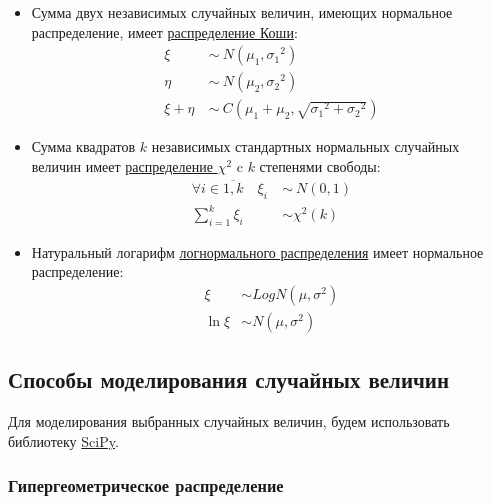 \documentclass[
  russian,
  a4paper,
]{article}
\begin{document}
\begin{itemize}
\item
  Сумма двух независимых случайных величин, имеющих нормальное
  распределение, имеет
  \href{https://ru.wikipedia.org/wiki/Распределение_Коши}{распределение
  Коши}: \[\begin{aligned}
  \xi\ &\sim\ N(\mu_1, {\sigma_1}^2)\\
  \eta\ &\sim\ N(\mu_2, {\sigma_2}^2)\\
  \xi+\eta\ &\sim\ C(\mu_1 + \mu_2, \sqrt{{\sigma_1}^2 + {\sigma_2}^2})
  \end{aligned}\] 
\item
  Сумма квадратов \(k\) независимых стандартных нормальных случайных
  величин имеет
  \href{https://ru.wikipedia.org/wiki/Распределение_хи-квадрат}{распределение
  \(\chi^2\)} c \(k\) степенями свободы: \[\begin{aligned}
  \forall i \in \overline{1, k}\quad \xi_i\ &\sim\ N(0, 1)\\
  \sum_{i=1}^k \xi_i &\sim \chi^2(k)
  \end{aligned}\]
\item
  Натуральный логарифм
  \href{https://ru.wikipedia.org/wiki/Логнормальное_распределение}{логнормального
  распределения} имеет нормальное распределение: \[\begin{aligned}
  \xi &\sim LogN(\mu,\sigma^2)\\
  \ln\xi &\sim N(\mu,\sigma^2)
  \end{aligned}\]
\end{itemize}

\hypertarget{ux441ux43fux43eux441ux43eux431ux44b-ux43cux43eux434ux435ux43bux438ux440ux43eux432ux430ux43dux438ux44f-ux441ux43bux443ux447ux430ux439ux43dux44bux445-ux432ux435ux43bux438ux447ux438ux43d}{%
\subsection{Способы моделирования случайных
величин}\label{ux441ux43fux43eux441ux43eux431ux44b-ux43cux43eux434ux435ux43bux438ux440ux43eux432ux430ux43dux438ux44f-ux441ux43bux443ux447ux430ux439ux43dux44bux445-ux432ux435ux43bux438ux447ux438ux43d}}

Для моделирования выбранных случайных величин, будем использовать
библиотеку \href{https://www.scipy.org}{SciPy}.

\hypertarget{ux433ux438ux43fux435ux440ux433ux435ux43eux43cux435ux442ux440ux438ux447ux435ux441ux43aux43eux435-ux440ux430ux441ux43fux440ux435ux434ux435ux43bux435ux43dux438ux435-2}{%
\subsubsection{Гипергеометрическое
распределение}\label{ux433ux438ux43fux435ux440ux433ux435ux43eux43cux435ux442ux440ux438ux447ux435ux441ux43aux43eux435-ux440ux430ux441ux43fux440ux435ux434ux435ux43bux435ux43dux438ux435-2}}
\end{document}

